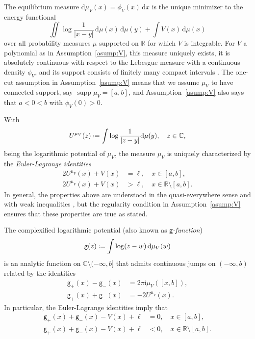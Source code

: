 \documentclass[reqno,a4paper,11pt]{amsart}
\DeclareMathOperator{\supp}{supp}
\newcommand{\C}{\mathbb{C}}
\newcommand{\R}{\mathbb{R}}
\newcommand{\ii}{\mathrm{i}}
\newcommand{\dd}{\mathrm{d}}
\newcommand*{\deff}{\mathrel{\vcenter{\baselineskip0.5ex \lineskiplimit0pt
                     \hbox{\scriptsize.}\hbox{\scriptsize.}}}%
                     =}
\newcommand{\msf}{\mathsf}
\theoremstyle{definition}
\theoremstyle{remark}
\numberwithin{equation}{section}
\newcommand*{\defeq}{\mathrel{\vcenter{\baselineskip0.5ex \lineskiplimit0pt
                     \hbox{\scriptsize.}\hbox{\scriptsize.}}}%
                     =}
\begin{document}
The equilibrium measure $\dd \mu_V(x) = \phi_V(x) \, \dd x$ is the unique minimizer to the energy functional
\[
    \iint \log \frac{1}{|x-y|} \, \dd \mu(x) \, \dd \mu(y) + \int V(x) \, \dd \mu(x)
\]
    over all probability measures $\mu$ supported on $\R$ for which $V$ is integrable. For $V$ a polynomial as in Assumption~\ref{asump:V}, this measure uniquely exists, it is absolutely continuous with respect to the Lebesgue measure with a continuous density $\phi_V$, and its support consists of finitely many compact intervals \cite{deift_kriecherbauer_mclaughlin}. The one-cut assumption in Assumption~\ref{asump:V} means that we assume $\mu_V$ to have connected support, say $\supp\mu_V=[a,b]$, and Assumption~\ref{asump:V} also says that $a<0<b$ with $\phi_V(0)>0$.
    
With
%
$$
U^{\mu_V}(z)\deff \int \log\frac{1}{|z-y|}\dd\mu(y),\quad z\in \C,
$$    
%
being the logarithmic potential of $\mu_V$, the measure $\mu_V$ is uniquely characterized by the \textit{Euler-Lagrange identities}
    \begin{equation}\label{eq:EulerLagrange}
        \begin{split}
        2 U^{\mu_V}(x) + V(x) &= \ell, \quad x \in [a,b], \\
        2 U^{\mu_V}(x) + V(x) &> \ell, \quad x \in \R \setminus [a,b].
        \end{split}
    \end{equation}
%
In general, the properties above are understood in the quasi-everywhere sense and with weak inequalities \cite{Saff_book}, but the regularity condition in Assumption~\ref{asump:V} ensures that these properties are true as stated. 

    The complexified logarithmic potential (also known as \textit{$\msf g$-function})
    \begin{equation}\label{eq:g_function}
        \msf g(z) \defeq  \int \log (z-w) \, \dd \mu_V(w)
    \end{equation}
    is an analytic function on $\C \setminus (-\infty, b]$ that admits continuous jumps on $(-\infty,b)$ related by the identities
    \[
        \begin{split}
        \msf g_+(x) - \msf g_-(x) &= 2 \pi \ii  \mu_V([x,b]), \\
        \msf g_+(x) + \msf g_-(x) &= -2 U^{\mu_V}(x).
        \end{split}
    \]
    In particular, the Euler-Lagrange identities 
    imply that
    \[
        \begin{split}
        \msf g_+(x) + \msf g_-(x) - V(x) + \ell &= 0, \quad x \in [a,b], \\
        \msf g_+(x) + \msf g_-(x) - V(x) + \ell &< 0, \quad x \in \R \setminus [a,b].
        \end{split}
    \]
\end{document}
